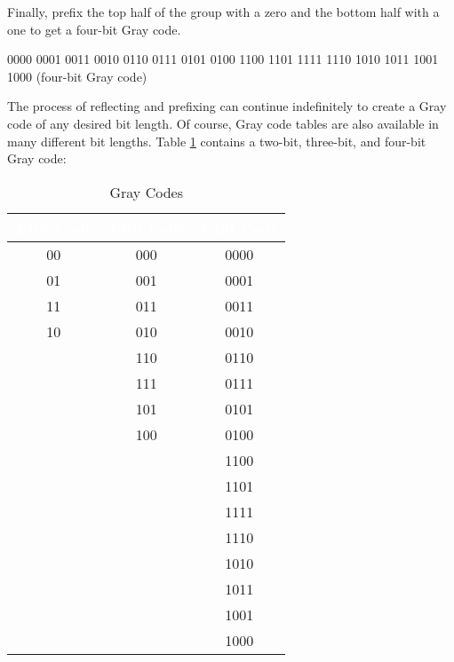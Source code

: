 Finally, prefix the top half of the group with a zero and the bottom half with a one to get a four-bit Gray code. 

\begin{binDisp}
     0000
     0001
     0011
     0010
     0110
     0111
     0101
     0100
     1100
     1101
     1111
     1110
     1010
     1011
     1001
     1000  (four-bit Gray code)
\end{binDisp}

The process of reflecting and prefixing can continue indefinitely to create a Gray code of any desired bit length. Of course, Gray code tables are also available in many different bit lengths. Table \ref{MO:tab:gray_codes} contains a two-bit, three-bit, and four-bit Gray code:

\begin{table}[H]
  \sffamily
  \newcommand{\head}[1]{\textcolor{white}{\textbf{#1}}}    
  \begin{center}
    \begin{tabular}{ c c c } 
      \hline
      \rowcolor{black!75}
      {\head{2-Bit Code}} & {\head{3-Bit Code}} & \head{4-Bit Code} \\ 
      \hline    
      00  & 000 & 0000 \\     
      01  & 001 & 0001 \\     
      11  & 011 & 0011 \\     
      10  & 010 & 0010 \\     
      & 110 & 0110 \\     
      & 111 & 0111 \\     
      & 101 & 0101 \\     
      & 100 & 0100 \\     
      &     & 1100 \\     
      &     & 1101 \\     
      &     & 1111 \\     
      &     & 1110 \\     
      &     & 1010 \\     
      &     & 1011 \\     
      &     & 1001 \\     
      &     & 1000 \\     
      \hline  
    \end{tabular}
  \end{center}
  \caption{Gray Codes}
  \label{MO:tab:gray_codes}
\end{table}

